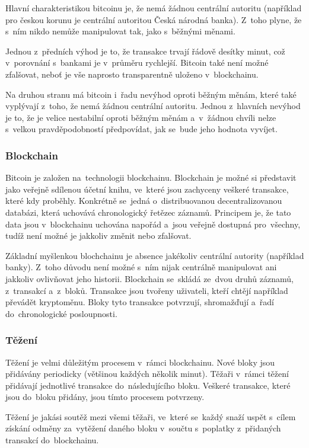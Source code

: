 \documentclass[thesis=B,czech]{FITthesis}[2019/03/21]
\begin{document}
Hlavní charakteristikou bitcoinu je, že nemá žádnou centrální autoritu (například pro českou korunu je centrální autoritou Česká národná banka). Z~toho plyne, že s~ním nikdo nemůže manipulovat tak, jako s~běžnými měnami.

Jednou z~předních výhod je to, že transakce trvají řádově desítky minut, což v~porovnání s~bankami je v~průměru rychlejší. Bitcoin také není možné zfalšovat, neboť je vše naprosto transparentně uloženo v~blockchainu.

Na druhou stranu má bitcoin i~řadu nevýhod oproti běžným měnám, které také vyplývají z~toho, že nemá žádnou centrální autoritu. Jednou z~hlavních nevýhod je to, že je velice nestabilní oproti běžným měnám a~v~žádnou chvíli nelze s~velkou pravděpodobností předpovídat, jak se~bude jeho hodnota vyvíjet. \cite{Finex}

\subsubsection{Blockchain}
Bitcoin je založen na~technologii blockchainu. Blockchain je možné si představit jako veřejně sdílenou účetní knihu, ve~které jsou zachyceny veškeré transakce, které kdy proběhly. Konkrétně se~jedná o~distribuovanou decentralizovanou databázi, která uchovává chronologický řetězec záznamů. Principem je, že tato data jsou v~blockchainu uchována napořád a~jsou veřejně dostupná pro~všechny, tudíž není možné je jakkoliv změnit nebo zfalšovat. \cite{Bitcoin_how_it_works}

Základní myšlenkou blochchainu je absence jakékoliv centrální autority (například banky). Z~toho důvodu není možné s~ním nijak centrálně manipulovat ani jakkoliv ovlivňovat jeho historii.
Blockchain se~skládá ze~dvou druhů záznamů, z~transakcí a~z~bloků. Transakce jsou tvořeny uživateli, kteří chtějí například převádět kryptoměnu. Bloky tyto transakce potvrzují, shromažďují a~řadí do~chronologické posloupnosti. \cite{Finex_blockchain}

\subsubsection{Těžení}
Těžení je velmi důležitým procesem v~rámci blockchainu. Nové bloky jsou přidávány periodicky (většinou každých několik minut). Těžaři v~rámci těžení přidávají jednotlivé transakce do~následujícího bloku. Veškeré transakce, které jsou do~bloku přidány, jsou tímto procesem potvrzeny. 

Těžení je jakási soutěž mezi všemi těžaři, ve~které se~každý snaží uspět s~cílem získání odměny za~vytěžení daného bloku v~součtu s~poplatky z~přidaných transakcí do~blockchainu.
\end{document}

